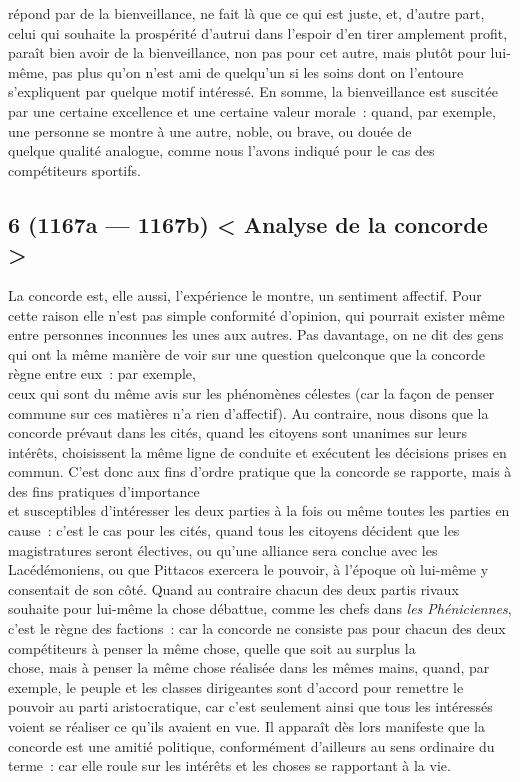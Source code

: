 \documentclass[french,twoside]{book} %
\begin{document}
répond par de la bienveillance, ne fait là que ce qui est juste, et, d’autre part, celui qui souhaite la prospérité d’autrui dans l’espoir d’en tirer amplement profit, paraît bien avoir de la bienveillance, non pas pour cet autre, mais plutôt pour lui-même, pas plus qu’on n’est ami de quelqu’un si les soins dont on l’entoure s’expliquent par quelque motif intéressé. En somme, la bienveillance est suscitée par une certaine excellence et une certaine valeur morale : quand, par exemple, une personne se montre à une autre, noble, ou brave, ou douée de \\
quelque qualité analogue, comme nous l’avons indiqué pour le cas des compétiteurs sportifs.
\subsection[{6 (1167a — 1167b) < Analyse de la concorde >}]{6 (1167a — 1167b) < Analyse de la concorde >}
\noindent La concorde est, elle aussi, l’expérience le montre, un sentiment affectif. Pour cette raison elle n’est pas simple conformité d’opinion, qui pourrait exister même entre personnes inconnues les unes aux autres. Pas davantage, on ne dit des gens qui ont la même manière de voir sur une question quelconque que la concorde règne entre eux : par exemple, \\
ceux qui sont du même avis sur les phénomènes célestes (car la façon de penser commune sur ces matières n’a rien d’affectif). Au contraire, nous disons que la concorde prévaut dans les cités, quand les citoyens sont unanimes sur leurs intérêts, choisissent la même ligne de conduite et exécutent les décisions prises en commun. C’est donc aux fins d’ordre pratique que la concorde se rapporte, mais à des fins pratiques d’importance \\
et susceptibles d’intéresser les deux parties à la fois ou même toutes les parties en cause : c’est le cas pour les cités, quand tous les citoyens décident que les magistratures seront électives, ou qu’une alliance sera conclue avec les Lacédémoniens, ou que Pittacos exercera le pouvoir, à l’époque où lui-même y consentait de son côté. Quand au contraire chacun des deux partis rivaux souhaite pour lui-même la chose débattue, comme les chefs dans {\itshape les Phéniciennes}, c’est le règne des factions : car la concorde ne consiste pas pour chacun des deux compétiteurs à penser la même chose, quelle que soit au surplus la \\
chose, mais à penser la même chose réalisée dans les mêmes  mains, quand, par exemple, le peuple et les classes dirigeantes sont d’accord pour remettre le pouvoir au parti aristocratique, car c’est seulement ainsi que tous les intéressés voient se réaliser ce qu’ils avaient en vue. Il apparaît dès lors manifeste que la concorde est une amitié politique, conformément d’ailleurs au sens ordinaire du terme : car elle roule sur les intérêts et les choses se rapportant à la vie.\par
\end{document}
